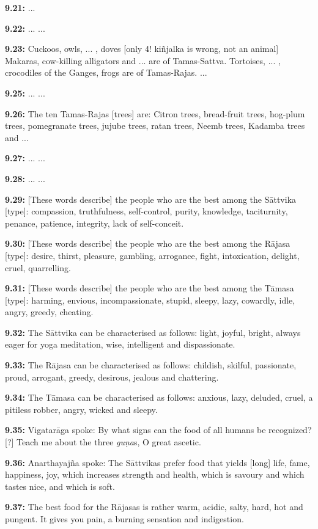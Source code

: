 \documentclass{article}
\newcommand{\vsnum}[1]{\textbf{#1}}
\newcommand{\skt}[1]{\textit{#1}}
\begin{document}
\vsnum{9.21: }...

\vsnum{9.22: }... ...

\vsnum{9.23: }Cuckoos, owls, ... , doves [only 4! kiñjalka is wrong, not an animal] Makaras, cow-killing alligators and ... are of Tamas-Sattva. Tortoises, ... , crocodiles of the Ganges, frogs are of Tamas-Rajas. ...

\vsnum{9.25: }... ...

\vsnum{9.26: }The ten Tamas-Rajas [trees] are: Citron trees, bread-fruit trees, hog-plum trees, pomegranate trees, jujube trees, ratan trees, Neemb trees, Kadamba trees and ...

\vsnum{9.27: }... ...

\vsnum{9.28: }... ...

\vsnum{9.29: }[These words describe] the people who are the best among the Sāttvika [type]: compassion, truthfulness, self-control, purity, knowledge, taciturnity, penance, patience, integrity, lack of self-conceit.

\vsnum{9.30: }[These words describe] the people who are the best among the Rājasa [type]: desire, thirst, pleasure, gambling, arrogance, fight, intoxication, delight, cruel, quarrelling.

\vsnum{9.31: }[These words describe] the people who are the best among the Tāmasa [type]: harming, envious, incompassionate, stupid, sleepy, lazy, cowardly, idle, angry, greedy, cheating.

\vsnum{9.32: }The Sāttvika can be characterised as follows: light, joyful, bright, always eager for yoga meditation, wise, intelligent and dispassionate.

\vsnum{9.33: }The Rājasa can be characterised as follows: childish, skilful, passionate, proud, arrogant, greedy, desirous, jealous and chattering.

\vsnum{9.34: }The Tāmasa can be characterised as follows: anxious, lazy, deluded, cruel, a pitiless robber, angry, wicked and sleepy.

\vsnum{9.35: }Vigatarāga spoke: By what signs can the food of all humans be recognized? [?] Teach me about the three \skt{guṇa}s, O great ascetic.

\vsnum{9.36: }Anarthayajña spoke: The Sāttvikas prefer food that yields [long] life, fame, happiness, joy, which increases strength and health, which is savoury and which tastes nice, and which is soft.

\vsnum{9.37: }The best food for the Rājasas is rather warm, acidic, salty, hard, hot and pungent. It gives you pain, a burning sensation and indigestion.
\end{document}
